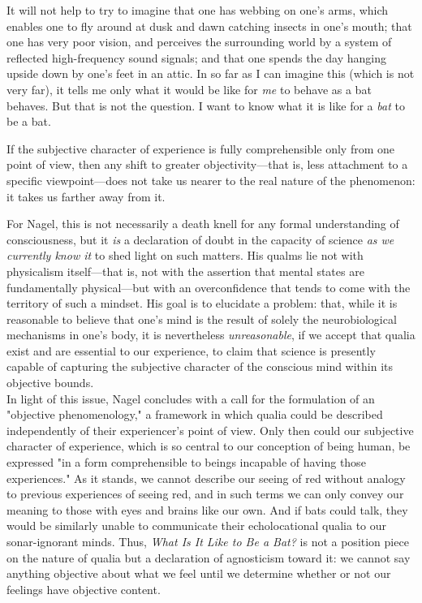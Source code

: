 \begin{tcolorbox}[breakable, enhanced, colback=textbook-blue, sharp corners]
	\begin{displayquote}
		It will not help to try to imagine that one has webbing on one's arms, which enables one to fly around at dusk and dawn catching insects in one's mouth; that one has very poor vision, and perceives the surrounding world by a system of reflected high-frequency sound signals; and that one spends the day hanging upside down by one's feet in an attic. In so far as I can imagine this (which is not very far), it tells me only what it would be like for \textit{me} to behave as a bat behaves. But that is not the question. I want to know what it is like for a \textit{bat} to be a bat.
		\begin{center}
			\mydots
		\end{center}
		If the subjective character of experience is fully comprehensible only from one point of view, then any shift to greater objectivity---that is, less attachment to a specific viewpoint---does not take us nearer to the real nature of the phenomenon: it takes us farther away from it. \\
	\end{displayquote}
	
	For Nagel, this is not necessarily a death knell for any formal understanding of consciousness, but it \textit{is} a declaration of doubt in the capacity of science \textit{as we currently know it} to shed light on such matters. His qualms lie not with physicalism itself---that is, not with the assertion that mental states are fundamentally physical---but with an overconfidence that tends to come with the territory of such a mindset. His goal is to elucidate a problem: that, while it is reasonable to believe that one's mind is the result of solely the neurobiological mechanisms in one's body, it is nevertheless \textit{unreasonable}, if we accept that qualia exist and are essential to our experience, to claim that science is presently capable of capturing the subjective character of the conscious mind within its objective bounds. \\
	
	In light of this issue, Nagel concludes with a call for the formulation of an "objective phenomenology," a framework in which qualia could be described independently of their experiencer's point of view. Only then could our subjective character of experience, which is so central to our conception of being human, be expressed "in a form comprehensible to beings incapable of having those experiences." As it stands, we cannot describe our seeing of red without analogy to previous experiences of seeing red, and in such terms we can only convey our meaning to those with eyes and brains like our own. And if bats could talk, they would be similarly unable to communicate their echolocational qualia to our sonar-ignorant minds. Thus, \textit{What Is It Like to Be a Bat?} is not a position piece on the nature of qualia but a declaration of agnosticism toward it: we cannot say anything objective about what we feel until we determine whether or not our feelings have objective content. \\
	

\end{tcolorbox}

